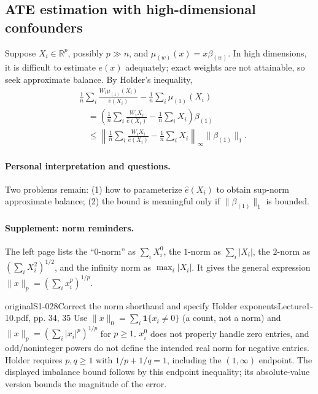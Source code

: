 \subsection{ATE estimation with high-dimensional confounders}
Suppose $X_i\in\mathbb R^p$, possibly $p\gg n$, and $\mu_{(w)}(x)=x\beta_{(w)}$. In high dimensions, it is difficult to estimate $e(x)$ adequately; exact weights are not attainable, so seek approximate balance. By Holder's inequality,
\begin{align*}
&\frac1n\sum_i\frac{W_i\mu_{(1)}(X_i)}{\widehat e(X_i)}-\frac1n\sum_i\mu_{(1)}(X_i)\\
&\quad=\left(\frac1n\sum_i\frac{W_iX_i}{\widehat e(X_i)}-\frac1n\sum_iX_i\right)\beta_{(1)}\\
&\quad\leq\left\|\frac1n\sum_i\frac{W_iX_i}{\widehat e(X_i)}-\frac1n\sum_iX_i\right\|_\infty\|\beta_{(1)}\|_1.
\end{align*}
 
\paragraph{Personal interpretation and questions.}
 Two problems remain: (1) how to parameterize $\widehat e(X_i)$ to obtain sup-norm approximate balance; (2) the bound is meaningful only if $\|\beta_{(1)}\|_1$ is bounded. 
\paragraph{Supplement: norm reminders.}
The left page lists the ``0-norm'' as $\sum_iX_i^0$, the $1$-norm as $\sum_i|X_i|$, the $2$-norm as $(\sum_iX_i^2)^{1/2}$, and the infinity norm as $\max_i|X_i|$. It gives the general expression $\|x\|_p=(\sum_i x_i^p)^{1/p}$.
\begin{reviewnote}{original}{S1-028}{Correct the norm shorthand and specify Holder exponents}{Lecture1-10.pdf, pp. 34, 35}
Use $\|x\|_0=\sum_i\mathbf1\{x_i\ne0\}$ (a count, not a norm) and $\|x\|_p=(\sum_i|x_i|^p)^{1/p}$ for $p\ge1$. $x_i^0$ does not properly handle zero entries, and odd/noninteger powers do not define the intended real norm for negative entries. Holder requires $p,q\ge1$ with $1/p+1/q=1$, including the $(1,\infty)$ endpoint. The displayed imbalance bound follows by this endpoint inequality; its absolute-value version bounds the magnitude of the error.
\end{reviewnote}


